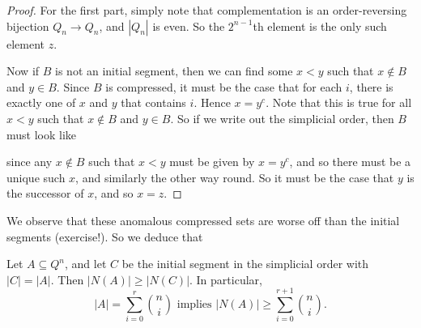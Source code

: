 \documentclass[a4paper]{article}
\begin{document}
\begin{proof}
  For the first part, simply note that complementation is an order-reversing bijection $Q_n \to Q_n$, and $|Q_n|$ is even. So the $2^{n - 1}$th element is the only such element $z$.

  Now if $B$ is not an initial segment, then we can find some $x < y$ such that $x \not \in B$ and $y \in B$. Since $B$ is compressed, it must be the case that for each $i$, there is exactly one of $x$ and $y$ that contains $i$. Hence $x = y^c$. Note that this is true for all $x < y$ such that $x \not \in B$ and $y \in B$. So if we write out the simplicial order, then $B$ must look like
  \begin{center}
  \end{center}
 since any $x \not \in B$ such that $x < y$ must be given by $x = y^c$, and so there must be a unique such $x$, and similarly the other way round. So it must be the case that $y$ is the successor of $x$, and so $x = z$.
\end{proof}
We observe that these anomalous compressed sets are worse off than the initial segments (exercise!). So we deduce that


\begin{thm}[Harper, 1967]
  Let $A \subseteq Q^n$, and let $C$ be the initial segment in the simplicial order with $|C| = |A|$. Then $|N(A)| \geq |N(C)|$. In particular,
  \[
    |A| = \sum_{i = 0}^r \binom{n}{i}\text{ implies } |N(A)| \geq \sum_{i = 0}^{r + 1} \binom{n}{i}.
  \]
\end{thm}

\printindex
\end{document}
